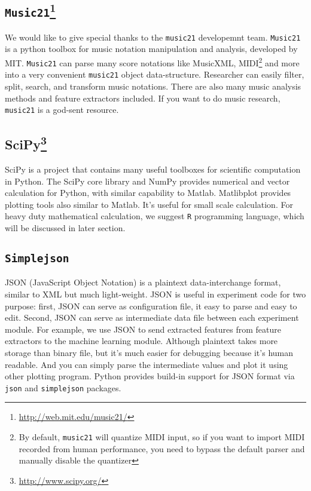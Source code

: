    \subsection*{\texttt{Music21}\footnote{\url{http://web.mit.edu/music21/}}}
   We would like to give special thanks to the \texttt{music21} developemnt team. \texttt{Music21} is a python toolbox for music notation manipulation and analysis, developed by MIT. \texttt{Music21} can parse many score notations like MusicXML, MIDI\footnote{By default, \texttt{music21} will quantize MIDI input, so if you want to import MIDI recorded from human performance, you need to bypass the default parser and manually disable the quantizer} and more into a very convenient \texttt{music21} object data-structure. Researcher can easily filter, split, search, and transform music notations. There are also many music analysis methods and feature extractors included. If you want to do music research, \texttt{music21} is a god-sent resource. 
   \subsection*{SciPy\footnote{\url{http://www.scipy.org/}}}
   SciPy is a project that contains many useful toolboxes for scientific computation in Python. The SciPy core library and NumPy provides numerical and vector calculation for Python, with similar capability to Matlab. Matlibplot provides plotting tools also similar to Matlab. It's useful for small scale calculation. For heavy duty mathematical calculation, we suggest \texttt{R} programming language, which will be discussed in later section.

   \subsection*{\texttt{Simplejson}}
   JSON (JavaScript Object Notation) is a plaintext data-interchange format, similar to XML but much light-weight. JSON is useful in experiment code for two purpose: first, JSON can serve as configuration file, it easy to parse and easy to edit. Second, JSON can serve as intermediate data file between each experiment module. For example, we use JSON to send extracted features from feature extractors to the machine learning module. Although plaintext takes more storage than binary file, but it's much easier for debugging because it's human readable. And you can simply parse the intermediate values and plot it using other plotting program. Python provides build-in support for JSON format via \texttt{json} and \texttt{simplejson} packages.


